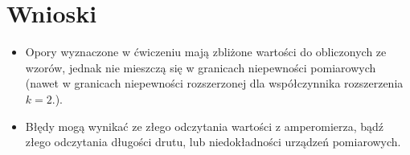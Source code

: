 \documentclass[a4paper,11pt]{article}
\begin{document}
\section{Wnioski}
\begin{itemize} 
\item Opory wyznaczone w ćwiczeniu mają zbliżone wartości do obliczonych ze wzorów, jednak nie mieszczą się w granicach niepewności pomiarowych (nawet w granicach niepewności rozszerzonej dla współczynnika rozszerzenia $k=2$.).
\item Błędy mogą wynikać ze złego odczytania wartości z amperomierza, bądź złego odczytania długości drutu, lub niedokładności urządzeń pomiarowych.
 
\end{itemize}
\end{document}
